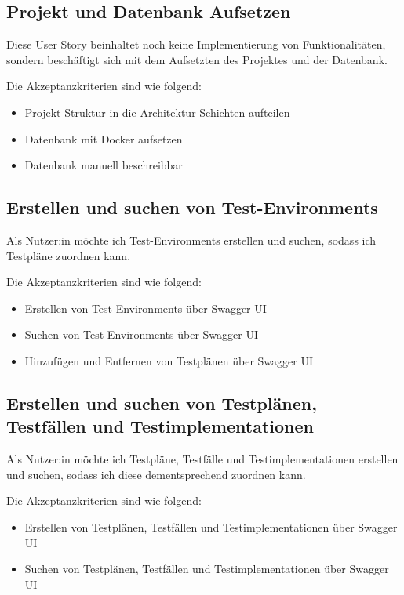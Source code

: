 \documentclass[a4paper, fontsize=11pt, parskip=half, twoside]{scrreprt}
\begin{document}
	\subsection{Projekt und Datenbank Aufsetzen}
	Diese User Story beinhaltet noch keine Implementierung von Funktionalitäten, sondern beschäftigt sich mit dem Aufsetzten des Projektes und der Datenbank.
	
	Die Akzeptanzkriterien sind wie folgend:
	\begin{itemize}
		\item Projekt Struktur in die Architektur Schichten aufteilen 
		\item Datenbank mit Docker aufsetzen
		\item Datenbank manuell beschreibbar
	\end{itemize}
	
	\subsection{Erstellen und suchen von Test-Environments}
	Als Nutzer:in möchte ich Test-Environments erstellen und suchen, sodass ich Testpläne zuordnen kann.
	
	Die Akzeptanzkriterien sind wie folgend:
	\begin{itemize}
		\item Erstellen von Test-Environments über Swagger \ac{UI}
		\item Suchen von Test-Environments über Swagger \ac{UI}
		\item Hinzufügen und Entfernen von Testplänen über Swagger \ac{UI}
	\end{itemize}

	\subsection{Erstellen und suchen von Testplänen, Testfällen und Testimplementationen}
	Als Nutzer:in möchte ich Testpläne, Testfälle und Testimplementationen erstellen und suchen, sodass ich diese dementsprechend zuordnen kann.
	
	Die Akzeptanzkriterien sind wie folgend:
	\begin{itemize}
		\item Erstellen von Testplänen, Testfällen und Testimplementationen über Swagger \ac{UI}
		\item Suchen von Testplänen, Testfällen und Testimplementationen über Swagger \ac{UI}
	\end{itemize}
	
\end{document}
